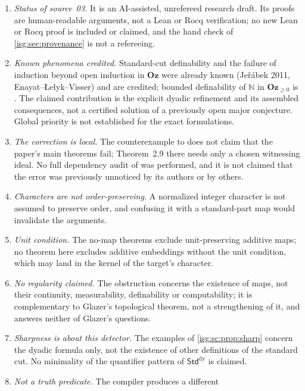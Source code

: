 \documentclass[11pt]{article}
\theoremstyle{definition}
\theoremstyle{remark}
\newcommand{\Oz}{\ensuremath{\mathbf{Oz}}}
\newcommand{\N}{\mathbb{N}}
\newcommand{\StdDy}{\mathsf{Std}^{\mathrm{dy}}}
\begin{document}
\begin{enumerate}[label=\textup{(N\arabic*)},leftmargin=*]
      system is not a global splitting (\cref{isg:cf:rem:finite}).
\item \emph{Status of source~03.} It is an AI-assisted, unrefereed
      research draft. Its proofs are human-readable arguments, not a Lean
      or Rocq verification; no new Lean or Rocq proof is included or
      claimed, and the hand check of \cref{isg:sec:provenance} is not a
      refereeing.
\item \emph{Known phenomena credited.} Standard-cut definability and the
      failure of induction beyond open induction in $\Oz$ were already
      known (Je\v r\'abek 2011, Enayat--\L e\l yk--Visser) and are credited;
      bounded definability of $\N$ in $\Oz_{\ge0}$ is
      \cite[Theorem~2.9]{ELV}. The claimed contribution is the explicit
      dyadic refinement and its assembled consequences, not a certified
      solution of a previously open major conjecture. Global priority is
      not established for the exact formulations.
\item \emph{The correction is local.} The counterexample to
      \cite[Lemma~2.7]{ELV} does not claim that the paper's main theorems
      fail; Theorem~2.9 there needs only a chosen witnessing ideal. No full
      dependency audit of \cite{ELV} was performed, and it is not claimed
      that the error was previously unnoticed by its authors or by others.
\item \emph{Characters are not order-preserving.} A normalized integer
      character is not assumed to preserve order, and confusing it with a
      standard-part map would invalidate the arguments.
\item \emph{Unit condition.} The no-map theorems exclude unit-preserving
      additive maps; no theorem here excludes additive embeddings without
      the unit condition, which may land in the kernel of the target's
      character.
\item \emph{No regularity claimed.} The obstruction concerns the existence
      of maps, not their continuity, measurability, definability or
      computability; it is complementary to Glazer's topological theorem,
      not a strengthening of it, and answers neither of Glazer's questions.
\item \emph{Sharpness is about this detector.} The examples of
      \cref{isg:sc:prop:sharp} concern the dyadic formula only, not the
      existence of other definitions of the standard cut. No minimality
      of the quantifier pattern of $\StdDy$ is claimed.
\item \emph{Not a truth predicate.} The compiler produces a different

\end{enumerate}
\end{document}
